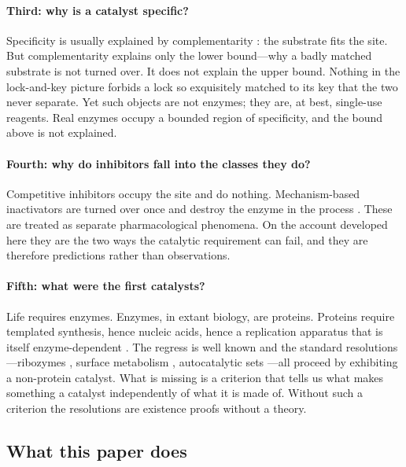 \documentclass[11pt,twocolumn,a4paper]{article}
\theoremstyle{plain}
\theoremstyle{definition}
\theoremstyle{remark}
\begin{document}
\paragraph{Third: why is a catalyst specific?}
Specificity is usually explained by complementarity \citep{fischer1894,
koshland1958}: the substrate fits the site. But complementarity explains only
the lower bound---why a badly matched substrate is not turned over. It does not
explain the upper bound. Nothing in the lock-and-key picture forbids a lock so
exquisitely matched to its key that the two never separate. Yet such objects are
not enzymes; they are, at best, single-use reagents. Real enzymes occupy a
bounded region of specificity, and the bound above is not explained.

\paragraph{Fourth: why do inhibitors fall into the classes they do?}
Competitive inhibitors occupy the site and do nothing. Mechanism-based
inactivators are turned over once and destroy the enzyme in the process
\citep{abeles1976,silverman1995}. These are treated as separate pharmacological
phenomena. On the account developed here they are the two ways the catalytic
requirement can fail, and they are therefore predictions rather than
observations.

\paragraph{Fifth: what were the first catalysts?}
Life requires enzymes. Enzymes, in extant biology, are proteins. Proteins
require templated synthesis, hence nucleic acids, hence a replication apparatus
that is itself enzyme-dependent \citep{eigen1971,gilbert1986,orgel2004}. The
regress is well known and the standard resolutions---ribozymes
\citep{kruger1982,guerrier1983}, surface metabolism \citep{wachtershauser1988},
autocatalytic sets \citep{kauffman1986}---all proceed by exhibiting a non-protein
catalyst. What is missing is a criterion that tells us what makes something a
catalyst independently of what it is made of. Without such a criterion the
resolutions are existence proofs without a theory.

\subsection{What this paper does}
\label{sec:what-this-does}
\end{document}
